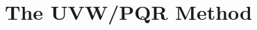 \documentclass{subfile}
\begin{document}
	\chapter{The UVW/PQR Method}\label{ch:uvw}
	\textcite{rozenberg_2011}
\end{document}

